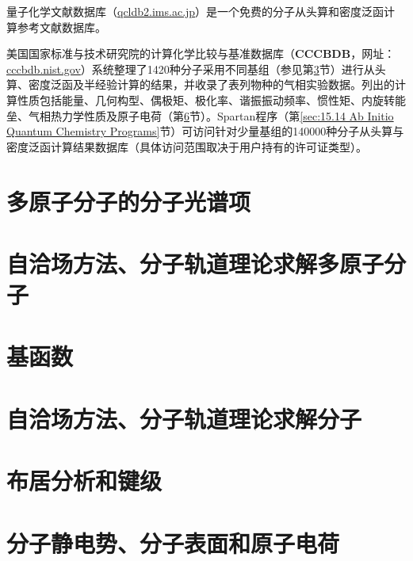     量子化学文献数据库（\url{qcldb2.ims.ac.jp}）是一个免费的分子从头算和密度泛函计算参考文献数据库。

    美国国家标准与技术研究院的计算化学比较与基准数据库（\textbf{CCCBDB}，网址：\url{cccbdb.nist.gov}）系统整理了1420种分子采用不同基组（参见第\ref{sec:15.4 Basis Functions}节）进行从头算、密度泛函及半经验计算的结果，并收录了表列物种的气相实验数据。列出的计算性质包括能量、几何构型、偶极矩、极化率、谐振振动频率、惯性矩、内旋转能垒、气相热力学性质及原子电荷（第\ref{sec:15.7 The Molecular Electrostatic Potential, Molecular Surfaces, and Atomic Charges}节）。Spartan程序（第\ref{sec:15.14 Ab Initio Quantum Chemistry Programs}节）可访问针对少量基组的140000种分子从头算与密度泛函计算结果数据库（具体访问范围取决于用户持有的许可证类型）。

\section{多原子分子的分子光谱项}
\label{sec:15.2 Electronic Terms of Polyatomic Molecules}
















\section{自洽场方法、分子轨道理论求解多原子分子}
\label{sec:15.3 The SCF MO Treatment of Polyatomic Molecules}

\section{基函数}
\label{sec:15.4 Basis Functions}

\section{自洽场方法、分子轨道理论求解分子}
\label{sec:15.5 The SCF MO Treatment of H2O}

\section{布居分析和键级}
\label{sec:15.6 Population Analysis and Bond Orders}

\section{分子静电势、分子表面和原子电荷}
\label{sec:15.7 The Molecular Electrostatic Potential, Molecular Surfaces, and Atomic Charges}

